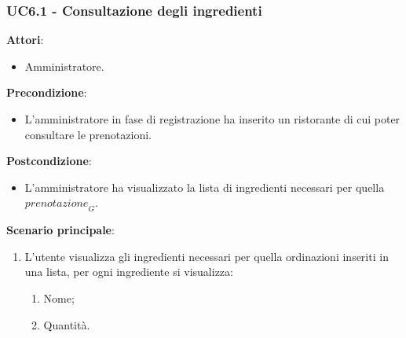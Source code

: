 \subsubsection{UC6.1 - Consultazione degli ingredienti}\label{usecase:6_1}
\textbf{Attori}:
\begin{itemize}
    \item Amministratore.
\end{itemize}
\textbf{Precondizione}:
\begin{itemize}
    \item L'amministratore in fase di registrazione ha inserito un ristorante di cui poter consultare le prenotazioni.
\end{itemize}
\textbf{Postcondizione}:
\begin{itemize}
    \item L'amministratore ha visualizzato la lista di ingredienti necessari per quella $\textit{prenotazione}_G$.
\end{itemize}
\textbf{Scenario principale}:
\begin{enumerate}
    \item L'utente visualizza gli ingredienti necessari per quella ordinazioni inseriti in una lista, per ogni ingrediente si visualizza:
    \begin{enumerate}
        \item Nome;
        \item Quantità.
    \end{enumerate}
\end{enumerate}